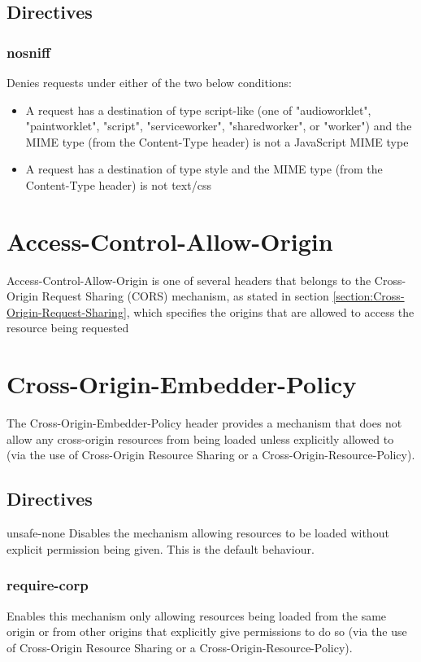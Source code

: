 \documentclass{mscreport}
\begin{document}
\subsection{Directives}
\subsubsection{nosniff}

Denies requests under either of the two below conditions:

\begin{itemize}
	\setlength\itemsep{0.1em}
	\item A request has a destination of type script-like (one of "audioworklet", "paintworklet", "script", "serviceworker", "sharedworker", or "worker") and the MIME type (from the Content-Type header) is not a JavaScript MIME type
	\item A request has a destination of type style and the MIME type (from the Content-Type header) is not text/css
\end{itemize}

\newpage

\section{Access-Control-Allow-Origin}

Access-Control-Allow-Origin is one of several headers that belongs to the Cross-Origin Request Sharing (CORS) mechanism, as stated in section \ref{section:Cross-Origin-Request-Sharing}, which specifies the origins that are allowed to access the resource being requested \cite{Apple2006-hk}


\section{Cross-Origin-Embedder-Policy}
The Cross-Origin-Embedder-Policy header provides a mechanism that does not allow any cross-origin resources from being loaded unless explicitly allowed to (via the use of Cross-Origin Resource Sharing or a Cross-Origin-Resource-Policy).

\subsection{Directives}
unsafe-none
Disables the mechanism allowing resources to be loaded without explicit permission being given. This is the default behaviour.

\subsubsection{require-corp}
Enables this mechanism only allowing resources being loaded from the same origin or from other origins that explicitly give permissions to do so (via the use of Cross-Origin Resource Sharing or a Cross-Origin-Resource-Policy).
\end{document}
